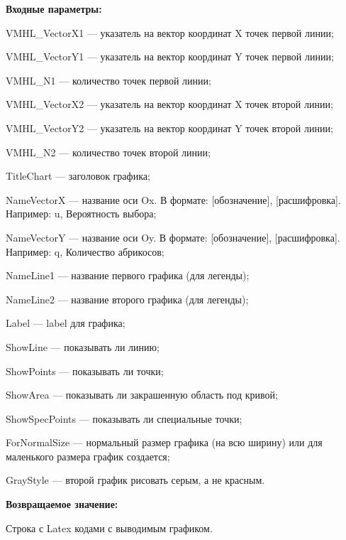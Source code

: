 \textbf{Входные параметры:}
 
VMHL\_VectorX1 --- указатель на вектор координат X точек первой линии;
 
VMHL\_VectorY1 --- указатель на вектор координат Y точек первой линии;
 
VMHL\_N1 --- количество точек первой линии;
 
VMHL\_VectorX2 --- указатель на вектор координат X точек второй линии;
 
VMHL\_VectorY2 --- указатель на вектор координат Y точек второй линии;
 
VMHL\_N2 --- количество точек второй линии;
 
TitleChart --- заголовок графика;
 
NameVectorX --- название оси Ox. В формате: [обозначение], [расшифровка]. Например: u, Вероятность выбора;
 
NameVectorY --- название оси Oy. В формате: [обозначение], [расшифровка]. Например: q, Количество абрикосов;
 
NameLine1 --- название первого графика (для легенды);
 
NameLine2 --- название второго графика (для легенды);
 
Label --- label для графика;
 
ShowLine --- показывать ли линию;
 
ShowPoints --- показывать ли точки;
 
ShowArea --- показывать ли закрашенную область под кривой;
 
ShowSpecPoints --- показывать ли специальные точки;
 
ForNormalSize --- нормальный размер графика (на всю ширину) или для маленького размера график создается;
 
GrayStyle --- второй график рисовать серым, а не красным.
	
\textbf{Возвращаемое значение:}

Строка с Latex кодами с выводимым графиком.